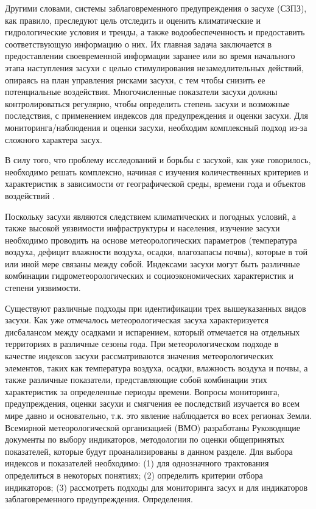 Другими словами, системы заблаговременного предупреждения о засухе (СЗПЗ), как правило, преследуют цель отследить и оценить климатические и гидрологические условия и тренды, а также водообеспеченность и предоставить соответствующую информацию о них. Их главная задача заключается в предоставлении своевременной информации заранее или во время начального этапа наступления засухи с целью стимулирования незамедлительных действий, опираясь на план управления рисками засухи, с тем чтобы снизить ее потенциальные воздействия. 
Многочисленные показатели засухи должны контролироваться регулярно, чтобы определить степень засухи и возможные последствия, с применением индексов для предупреждения и оценки засухи.
Для мониторинга/наблюдения и оценки засухи, необходим комплексный подход из-за сложного характера засух. 

В силу того, что проблему исследований и борьбы с засухой, как уже говорилось, необходимо решать комплексно, начиная с изучения количественных критериев и характеристик в зависимости от географической среды, времени года и объектов воздействий \cite{Zasuha2013, OON2010}.

Поскольку засухи являются следствием климатических и погодных условий, а также высокой уязвимости инфраструктуры и населения, изучение засухи необходимо проводить на основе метеорологических параметров (температура воздуха, дефицит влажности воздуха, осадки, влагозапасы почвы), которые в той или иной мере связаны между собой. 
Индексами засухи могут быть различные комбинации гидрометеорологических и социоэкономических характеристик и степени уязвимости.

Существуют различные подходы при идентификации трех вышеуказанных видов засухи.
Как уже отмечалось метеорологическая засуха характеризуется дисбалансом между осадками и испарением, который отмечается на отдельных территориях в различные сезоны года. При метеорологическом подходе в качестве индексов засухи рассматриваются значения метеорологических элементов, таких как температура воздуха, осадки, влажность воздуха и почвы, а также различные показатели, представляющие собой комбинации этих характеристик за определенные периоды времени.
Вопросы мониторинга, предупреждения, оценки засухи и смягчения ее последствий изучается во всем мире давно и основательно, т.к. это явление наблюдается во всех регионах Земли. Всемирной метеорологической организацией (ВМО) разработаны Руководящие документы по выбору индикаторов, методологии по оценки общепринятых показателей, которые будут проанализированы в данном разделе.
Для выбора индексов и показателей необходимо: (1) для однозначного трактования определиться в некоторых понятиях; (2) определить критерии отбора индикаторов; (3) рассмотреть подходы для мониторинга засух и для индикаторов заблаговременного предупреждения.
Определения.

